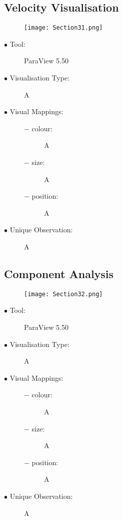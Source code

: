 \documentclass{article}
\begin{document}
\subsection{Velocity Visualisation}
\begin{figure}[h]
	\centering
	\texttt{[image: Section31.png]}
\end{figure}
\begin{description}
	\item[$\bullet$ Tool:] ParaView 5.50
	\item[$\bullet$ Visualisation Type:] A
	\item[$\bullet$ Visual Mappings:] \hfill
		\begin{description}
			\item[$-$ colour:] A
			\item[$-$ size:] A
			\item[$-$ position:] A
		\end{description}
	\item[$\bullet$ Unique Observation:] A
\end{description}
\newpage

\subsection{Component Analysis}
\begin{figure}[h]
	\centering
	\texttt{[image: Section32.png]}
\end{figure}
\begin{description}
	\item[$\bullet$ Tool:] ParaView 5.50
	\item[$\bullet$ Visualisation Type:] A
	\item[$\bullet$ Visual Mappings:] \hfill
		\begin{description}
			\item[$-$ colour:] A
			\item[$-$ size:] A
			\item[$-$ position:] A
		\end{description}
	\item[$\bullet$ Unique Observation:] A
\end{description}
\newpage
\end{document}
